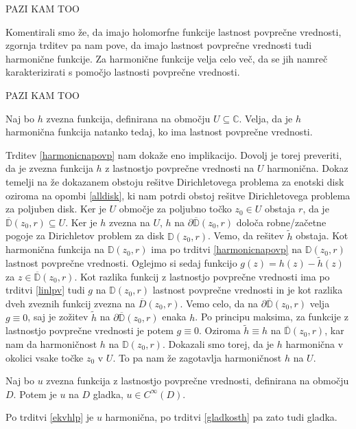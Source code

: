 \documentclass[mat1]{fmfdelo}
\newcommand{\C}{\mathbb C}
\begin{document}
    PAZI KAM TOO
    \begin{opomba}
        Komentirali smo že, da imajo holomorfne funkcije lastnost povprečne vrednosti, zgornja trditev pa nam pove, da imajo lastnost povprečne vrednosti tudi harmonične funkcije. 
        Za harmonične funkcije velja celo več, da se jih namreč karakterizirati s pomočjo lastnosti povprečne vrednosti. 
    \end{opomba}
    PAZI KAM TOO

    \begin{trditev}
        \label{ekvhlp}
        Naj bo $h$ zvezna funkcija, definirana na območju $U \subseteq \C$. Velja, da je $h$ harmonična funkcija natanko tedaj, ko ima lastnost povprečne vrednosti.
    \end{trditev}
    \begin{dokaz}
        Trditev \ref{harmonicnapovp} nam dokaže eno implikacijo. Dovolj je torej preveriti, da je zvezna funkcija $h$ z lastnostjo povprečne vrednosti na $U$ harmonična. 
        Dokaz temelji na že dokazanem obstoju rešitve Dirichletovega problema za enotski disk oziroma na opombi \ref{alldisk}, ki nam potrdi obstoj rešitve Dirichletovega problema za poljuben disk. 
        \newline
        Ker je $U$ območje za poljubno točko $z_0 \in U$ obstaja $r$, da je $\overline{\mathbb{D}}(z_0,r) \subseteq U$. Ker je $h$ zvezna na $U$, $h$ na $\partial \overline{\mathbb{D}}(z_0, r)$ določa robne/začetne pogoje za Dirichletov problem za disk $\mathbb{D}(z_0,r)$.
        Vemo, da rešitev $\widetilde{h}$ obstaja. 
        Kot harmonična funkcija na $\mathbb{D}(z_0, r)$ ima po trditvi \ref{harmonicnapovp} na $\mathbb{D}(z_0, r)$ lastnost povprečne vrednosti. 
        Oglejmo si sedaj funkcijo $g(z) = h(z) - \widetilde{h}(z)$ za $z \in \overline{\mathbb{D}}(z_0,r)$. 
        Kot razlika funkcij z lastnostjo povprečne vrednosti ima po trditvi \ref{linlpv} tudi $g$ na $\mathbb{D}(z_0, r)$ lastnost povprečne vrednosti in je kot razlika dveh zveznih funkcij zvezna na $\overline{D}(z_0, r)$.
        Vemo celo, da na $\partial \overline{\mathbb{D}}(z_0, r)$ velja $g \equiv 0$, saj je zožitev $\widetilde{h}$ na $\partial \overline{\mathbb{D}}(z_0,r)$ enaka $h$. 
        Po principu maksima, za funkcije z lastnostjo povprečne vrednosti je potem $g \equiv 0$. Oziroma $\widetilde{h} \equiv h$ na $\overline{\mathbb{D}}(z_0, r)$, kar nam da harmoničnost $h$ na $\mathbb{D}(z_0, r)$. 
        Dokazali smo torej, da je $h$ harmonična v okolici vsake točke $z_0$ v $U$. To pa nam že zagotavlja harmoničnost $h$ na $U$. 
    \end{dokaz}
    \begin{trditev}
        Naj bo $u$ zvezna funkcija z lastnostjo povprečne vrednosti, definirana na območju $D$. Potem je $u$ na $D$ gladka, $u \in C^{\infty}(D)$.
    \end{trditev}
    \begin{dokaz}
        Po trditvi \ref{ekvhlp} je $u$ harmonična, po trditvi \ref{gladkosth} pa zato tudi gladka.
    \end{dokaz}
\end{document}
